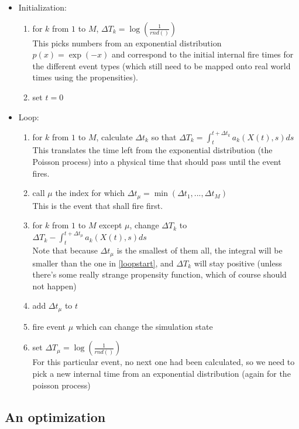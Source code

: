 \documentclass[a4paper,11pt]{article}
\begin{document}
			\begin{itemize}
				\item Initialization: 
				\begin{enumerate}
					\item for $k$ from $1$ to $M$, $\Delta T_k = \log\left(\frac{1}{rnd()}\right)$ \\
						This picks numbers from an exponential distribution $p(x) = \exp(-x)$ and correspond
						to the initial internal fire times for the different event types (which still need
						to be mapped onto real world times using the propensities).
					\item set $t = 0$
				\end{enumerate}
				\item Loop:
				\begin{enumerate}
					\item for $k$ from $1$ to $M$, calculate $\Delta t_k$ so that $\Delta T_k = \int_t^{t+\Delta t_k} a_k(X(t),s) ds $ \\
						This translates the time left from the exponential distribution (the Poisson process) into
						a physical time that should pass until the event fires. \label{loopstart}
					\item call $\mu$ the index for which $\Delta t_\mu = \min(\Delta t_1, ... , \Delta t_M)$ \\
						This is the event that shall fire first.
					\item for $k$ from $1$ to $M$ except $\mu$, change $\Delta T_k$ to $\Delta T_k - \int_t^{t+\Delta t_\mu} a_k(X(t),s) ds $ \\
						Note that because $\Delta t_\mu$ is the smallest of them all, the integral will be smaller
						than the one in \ref{loopstart}, and $\Delta T_k$ will stay positive (unless there's some 
						really strange propensity function, which of course should not happen)
					\item add $\Delta t_\mu$ to $t$
					\item fire event $\mu$ which can change the simulation state
					\item set $\Delta T_\mu = \log\left(\frac{1}{rnd()}\right)$ \\
						For this particular event, no next one had been calculated, so we need to pick
						a new internal time from an exponential distribution (again for the poisson process)
				\end{enumerate}
			\end{itemize}
		

		\subsection{An optimization}
\end{document}
